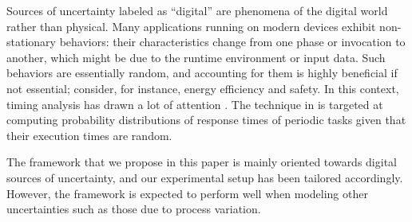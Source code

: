 Sources of uncertainty labeled as ``digital'' are phenomena of the digital world
rather than physical. Many applications running on modern devices exhibit
non-stationary behaviors: their characteristics change from one phase or
invocation to another, which might be due to the runtime environment or input
data. Such behaviors are essentially random, and accounting for them is highly
beneficial if not essential; consider, for instance, energy efficiency and
safety. In this context, timing analysis has drawn a lot of attention
\cite{quinton2012}. The technique in \cite{tanasa2015} is targeted at computing
probability distributions of response times of periodic tasks given that their
execution times are random.

The framework that we propose in this paper is mainly oriented towards digital
sources of uncertainty, and our experimental setup has been tailored
accordingly. However, the framework is expected to perform well when modeling
other uncertainties such as those due to process variation.
